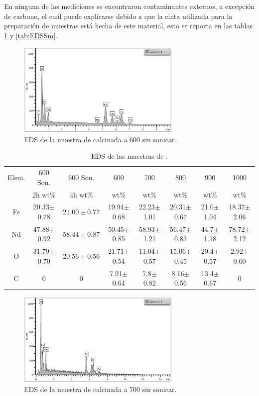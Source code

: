 \documentclass[../main.tex]{subfiles}
\begin{document}
En ninguna de las mediciones se encontraron contaminantes externos, a excepción de carbono, el cuál puede explicarse debido a que la cinta utilizada para la preparación de muestras está hecha de este material, esto se reporta en las tablas \ref{tab:EDSNd} y \ref{tab:EDSSm}.
\begin{figure}[H]
    \centering
    \includegraphics[width=0.7\textwidth]{fig/resEDSNeod.png}
    \caption{EDS de la muestra de \neod{} calcinada a 600\gradoC{} sin sonicar.}
    \label{fig:resEDSNeod}
\end{figure}
\begin{table}[H]
    \begin{tabular}{|c||c|c|c|c|c|c|c|}
        \hline
        Elem. &600\gradoC{} Son.&600\gradoC{} Son.&600\gradoC{}&700\gradoC{}&800\gradoC{}&900\gradoC{}&1000\gradoC{}\\
        &2h wt\%&4h wt\%&wt\%&wt\%&wt\%&wt\%&wt\%\\
        \hline\hline
        Fe & 20.33$\pm$0.78 &$21.00\pm0.77$& 19.94$\pm$0.68 & 22.23$\pm$1.01 & 20.31$\pm$0.67 & 21.0$\pm$1.04 & 18.37$\pm$2.06 \\
        Nd & 47.88$\pm$0.92 &$58.44\pm0.87$& 50.45$\pm$0.85 & 58.93$\pm$1.21 & 56.47$\pm$0.83 & 44.7$\pm$1.18 & 78.72$\pm$2.12 \\
        O & 31.79$\pm$0.70 &$20.56\pm0.56$& 21.71$\pm$0.54 & 11.04$\pm$0.57 & 15.06$\pm$0.45 & 20.4$\pm$0.57 & 2.92$\pm$0.60 \\
        C & 0 & 0 & 7.91$\pm$0.64 & 7.8$\pm$0.82 & 8.16$\pm$0.56 & 13.4$\pm$0.67 &0 \\ 
        \hline
        \end{tabular} 
            \caption{EDS de las muestras de \neod{}.}
            \label{tab:EDSNd}
        \end{table}
\begin{figure}[H]
    \centering
    \includegraphics[width=0.7\textwidth]{fig/resEDSSama.png}
    \caption{EDS de la muestra de \sama{} calcinada a 700\gradoC{} sin sonicar.}
    \label{fig:resEDSSama}
\end{figure}
\end{document}
